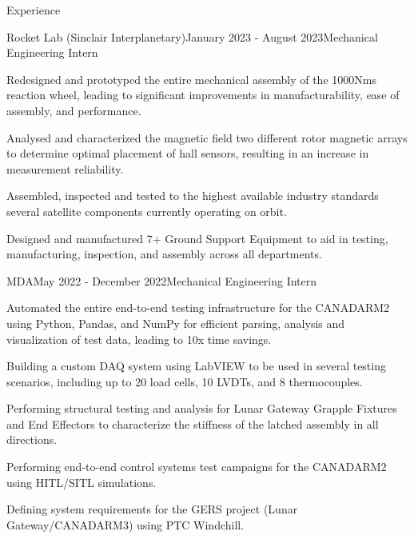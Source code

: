 \documentclass{resume} %
\begin{document}

\begin{rSection}{Experience}

\begin{rSubsection}{Rocket Lab (Sinclair Interplanetary)}{January 2023 - August 2023}{Mechanical Engineering Intern}{}

\item Redesigned and prototyped the entire mechanical assembly of the 1000Nms reaction wheel, leading to significant improvements in manufacturability, ease of assembly, and performance.
\item Analysed and characterized the magnetic field two different rotor magnetic arrays to determine optimal placement of hall sensors, resulting in an increase in measurement reliability.
\item Assembled, inspected and tested to the highest available industry standards several satellite components currently operating on orbit.
\item Designed and manufactured 7+ Ground Support Equipment to aid in testing, manufacturing, inspection, and assembly across all departments.

\end{rSubsection}

\begin{rSubsection}{MDA}{May 2022 - December 2022}{Mechanical Engineering Intern}{}

\item Automated the entire end-to-end testing infrastructure for the CANADARM2 using Python, Pandas, and NumPy for efficient parsing, analysis and visualization of test data, leading to 10x time savings.
\item Building a custom DAQ system using LabVIEW to be used in several testing scenarios, including up to 20 load cells, 10 LVDTs, and 8 thermocouples.
\item Performing structural testing and analysis for Lunar Gateway Grapple Fixtures and End Effectors to characterize the stiffness of the latched assembly in all directions.
\item Performing end-to-end control systems test campaigns for the CANADARM2 using HITL/SITL simulations.
\item Defining system requirements for the GERS project (Lunar Gateway/CANADARM3) using PTC Windchill.


\end{rSubsection}
\end{rSection}
\end{document}
